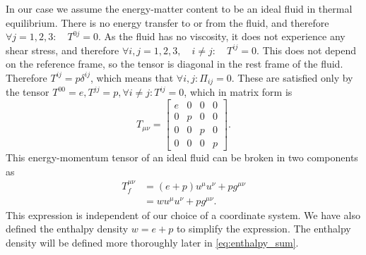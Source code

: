 In our case we assume the energy-matter content to be an ideal fluid in thermal equilibrium.
There is no energy transfer to or from the fluid, and therefore
$\forall j=1,2,3: \quad T^{0j} = 0$.
As the fluid has no viscosity, it does not experience any shear stress, and therefore
$\forall i,j=1,2,3, \quad i \neq j: \quad T^{ij} = 0$.
This does not depend on the reference frame, so the tensor is diagonal in the rest frame of the fluid.
Therefore $T^{ij} = p \delta^{ij}$, which means that
$\forall i,j: \Pi_{ij} = 0$.
These are satisfied only by the tensor $T^{00}=e, T^{jj}=p, \forall i \neq j: T^{ij}=0$, which in matrix form is
\begin{equation}
T_{\mu \nu} =
\begin{bmatrix}
e & 0 & 0 & 0 \\
0 & p & 0 & 0 \\
0 & 0 & p & 0 \\
0 & 0 & 0 & p
\end{bmatrix}.
\end{equation}
This
energy-momentum tensor of an ideal fluid can be broken in two components as
\cites[eq. 5.11, 5.23]{lecture_notes}[eq. 4.12]{rasanen_gr_2022}
\begin{align}
T^{\mu \nu}_f
&= (e+p) u^\mu u^\nu + p g^{\mu \nu}
\label{eq:ep_tensor} \\
&= w u^\mu u^\nu + p g^{\mu \nu}.
\end{align}
This expression is independent of our choice of a coordinate system.
We have also defined the enthalpy density $w = e+p$ to simplify the expression.
The enthalpy density will be defined more thoroughly later in \eqref{eq:enthalpy_sum}.

